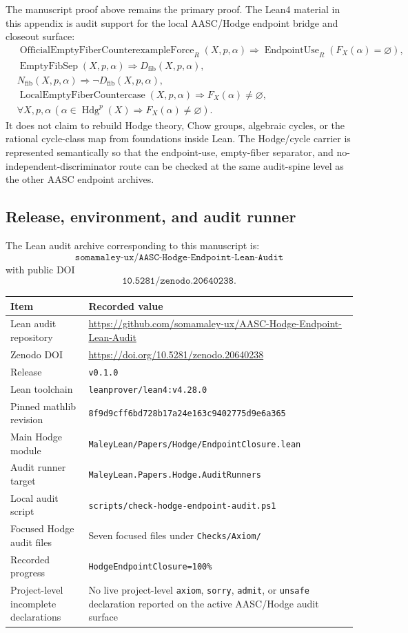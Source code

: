 \documentclass[11pt]{article}
\newcommand{\Hdg}{\operatorname{Hdg}}
\newcommand{\EndpointUse}{\operatorname{EndpointUse}}
\begin{document}
The manuscript proof above remains the primary proof. The Lean4 material in this appendix is audit support for the local AASC/Hodge endpoint bridge and closeout surface:
\[
\begin{aligned}
&\operatorname{OfficialEmptyFiberCounterexampleForce}_R(X,p,\alpha)
   \Rightarrow \EndpointUse_R(F_X(\alpha)=\varnothing),\\
&\operatorname{EmptyFibSep}(X,p,\alpha)
   \Rightarrow D_{\mathrm{fib}}(X,p,\alpha),\\
&N_{\mathrm{fib}}(X,p,\alpha)\Rightarrow \neg D_{\mathrm{fib}}(X,p,\alpha),\\
&\operatorname{LocalEmptyFiberCountercase}(X,p,\alpha)
   \Rightarrow F_X(\alpha)\neq\varnothing,\\
&\forall X,p,\alpha\, (\alpha\in\Hdg^p(X)\Rightarrow F_X(\alpha)\neq\varnothing).
\end{aligned}
\]
It does not claim to rebuild Hodge theory, Chow groups, algebraic cycles, or the rational cycle-class map from foundations inside Lean. The Hodge/cycle carrier is represented semantically so that the endpoint-use, empty-fiber separator, and no-independent-discriminator route can be checked at the same audit-spine level as the other AASC endpoint archives.

\subsection{Release, environment, and audit runner}

The Lean audit archive corresponding to this manuscript is:
\[
\texttt{somamaley-ux/AASC-Hodge-Endpoint-Lean-Audit}
\]
with public DOI
\[
\texttt{10.5281/zenodo.20640238}.
\]

{\scriptsize
\begin{longtable}{p{}p{}}
\toprule Item & Recorded value\\ \midrule\endhead
Lean audit repository & \url{https://github.com/somamaley-ux/AASC-Hodge-Endpoint-Lean-Audit}\\
Zenodo DOI & \url{https://doi.org/10.5281/zenodo.20640238}\\
Release & \texttt{v0.1.0}\\
Lean toolchain & \texttt{leanprover/lean4:v4.28.0}\\
Pinned mathlib revision & \texttt{8f9d9cff6bd728b17a24e163c9402775d9e6a365}\\
Main Hodge module & \texttt{MaleyLean/Papers/Hodge/EndpointClosure.lean}\\
Audit runner target & \texttt{MaleyLean.Papers.Hodge.AuditRunners}\\
Local audit script & \texttt{scripts/check-hodge-endpoint-audit.ps1}\\
Focused Hodge audit files & Seven focused files under \texttt{Checks/Axiom/}\\
Recorded progress & \texttt{HodgeEndpointClosure=100\%}\\
Project-level incomplete declarations & No live project-level \texttt{axiom}, \texttt{sorry}, \texttt{admit}, or \texttt{unsafe} declaration reported on the active AASC/Hodge audit surface\\
\bottomrule
\end{longtable}
}
\end{document}
